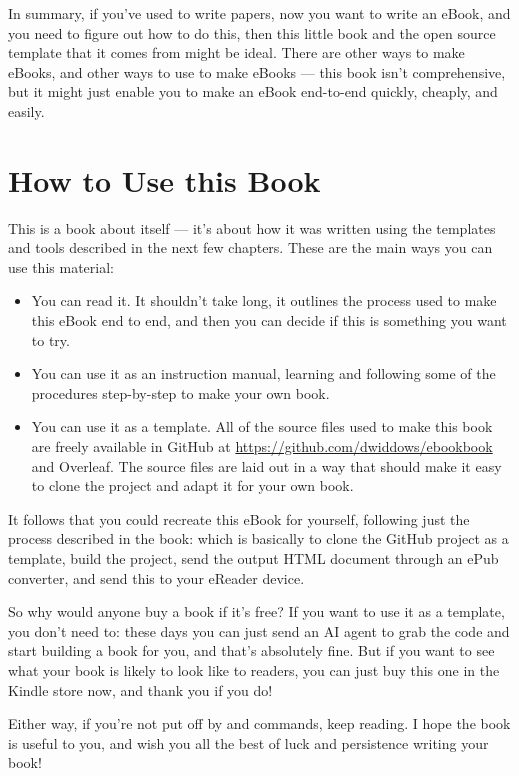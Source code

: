 In summary, if you've used \latex to write papers, now you want to write an eBook,
and you need to figure out how to do this, then this little book and
the open source template that it comes from might be ideal.
There are other ways to make eBooks, and other ways to use
\latex to make eBooks --- this book isn't comprehensive, but it might just
enable you to make an eBook end-to-end quickly, cheaply, and easily.

\section{How to Use this Book}
\label{sec:how_to_use}

This is a book about itself --- it's about how it was written using
the templates and tools described in 
the next few chapters. These are the main ways you can use this material:

\begin{itemize}
    \item You can read it. It shouldn't take long, it outlines the process
    used to make this eBook end to end, and then you can decide if this is something you want to try.
    \item You can use it as an instruction manual, learning and following some of the procedures step-by-step to make your own book.
    \item You can use it as a template. All of the source files used to make this book
    are freely available in GitHub at {\small \url{https://github.com/dwiddows/ebookbook}} and Overleaf.
    The source files are laid out in a way that should make it easy to clone the project and adapt it for your own book.
\end{itemize}

It follows that you could recreate this eBook for yourself, following just the process
described in the book: which is basically to clone the GitHub project as a template, build
the project, send the output HTML document through an ePub converter, and send this to
your eReader device.

So why would anyone buy a book if it's free?
If you want to use it as a template, you don't need to: these days you can just send an AI agent to grab the code and start building a book for you, and that's absolutely fine.
But if you want to see what your book is likely to look like to readers, you can just buy this one in the Kindle store now, and thank you if you do!

Either way, if you're not put off by \latex and 
commands, keep reading. I hope the book is useful to you, and wish you 
all the best of luck and persistence writing your book!
